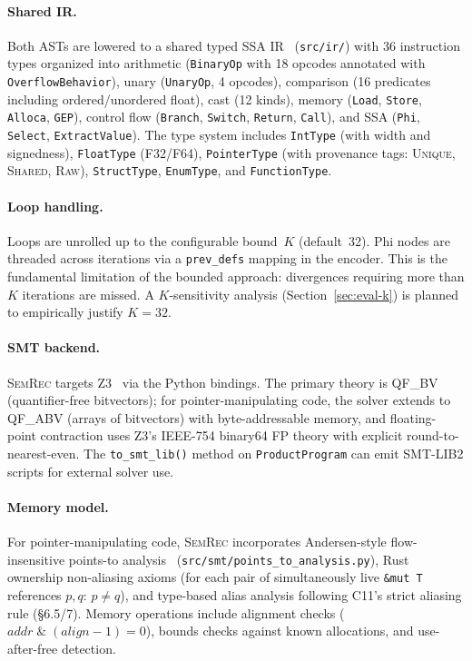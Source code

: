 \documentclass[10pt,a4paper]{article}
\begin{document}
\paragraph{Shared IR.}
Both ASTs are lowered to a shared typed SSA IR~\cite{cytron1991ssa}
(\texttt{src/ir/}) with 36 instruction types organized into
arithmetic (\texttt{BinaryOp} with 18 opcodes annotated with
\texttt{OverflowBehavior}), unary (\texttt{UnaryOp}, 4 opcodes),
comparison (16 predicates including ordered/unordered float),
cast (12 kinds), memory (\texttt{Load}, \texttt{Store},
\texttt{Alloca}, \texttt{GEP}), control flow (\texttt{Branch},
\texttt{Switch}, \texttt{Return}, \texttt{Call}), and SSA
(\texttt{Phi}, \texttt{Select}, \texttt{ExtractValue}).
The type system includes \texttt{IntType} (with width and signedness),
\texttt{FloatType} (F32/F64), \texttt{PointerType} (with provenance
tags: \textsc{Unique}, \textsc{Shared}, \textsc{Raw}),
\texttt{StructType}, \texttt{EnumType}, and \texttt{FunctionType}.

\paragraph{Loop handling.}
Loops are unrolled up to the configurable bound~$K$ (default~32).
Phi nodes are threaded across iterations via a \texttt{prev\_defs}
mapping in the encoder.  This is the fundamental limitation of the
bounded approach: divergences requiring more than $K$ iterations
are missed.  A $K$-sensitivity analysis
(Section~\ref{sec:eval-k}) is planned to empirically justify $K{=}32$.

\paragraph{SMT backend.}
\textsc{SemRec} targets Z3~\cite{demoura2008z3} via the Python
bindings.  The primary theory is QF\_BV (quantifier-free bitvectors);
for pointer-manipulating code, the solver extends to QF\_ABV (arrays
of bitvectors) with byte-addressable memory, and floating-point contraction
uses Z3's IEEE-754 binary64 FP theory with explicit round-to-nearest-even.  The
\texttt{to\_smt\_lib()} method on \texttt{ProductProgram} can
emit SMT-LIB2 scripts for external solver use.

\paragraph{Memory model.}
For pointer-manipulating code, \textsc{SemRec} incorporates
Andersen-style flow-insensitive points-to
analysis~\cite{andersen1994program}
(\texttt{src/smt/points\_to\_analysis.py}), Rust ownership
non-aliasing axioms (for each pair of simultaneously live
\texttt{\&mut T} references $p, q$: $p \neq q$), and type-based
alias analysis following C11's strict aliasing rule (\S6.5/7).
Memory operations include alignment checks ($\mathit{addr}
\;\&\; (\mathit{align} - 1) = 0$), bounds checks against
known allocations, and use-after-free detection.
\end{document}
